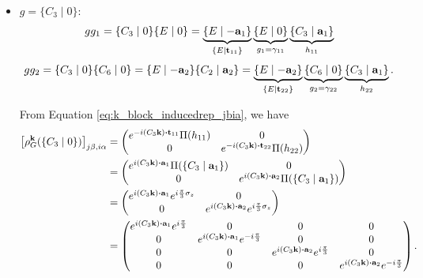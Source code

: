 \begin{itemize}
\item $g = \{C_3\mid 0\}$:
\begin{equation} \label{eq:spinful_graphene_generator_C3_g1_induced}
gg_1 = \{C_3 \mid 0\} \{E \mid 0\} = \underbrace{\{E \mid -{\vb{a}}_1\}}_{\{E\mid{\vb{t}}_{11}\}} \underbrace{\{E \mid 0\}}_{g_1 = \gamma_{11}} \underbrace{\{C_3 \mid {\vb{a}}_1\}}_{h_{11}}
\end{equation}
\begin{equation} \label{eq:spinful_graphene_C3_gg2}
gg_2 = \{C_3\mid 0\}\{C_6\mid 0\}= \{E\mid-{\vb{a}}_2\}\{C_2\mid{\vb{a}}_2\}= \underbrace{\{E\mid -{\vb{a}}_2\}}_{\{E\mid {\vb{t}}_{22}\}} \underbrace{\{C_6 \mid 0\}}_{g_2 = \gamma_{22}} \underbrace{\{C_3 \mid {\vb{a}}_1\}}_{h_{22}}.
\end{equation}

From Equation \ref{eq:k_block_inducedrep_jbia}, we have
\begin{align} \label{eq:rhoC3_inducedrep_k_jbia}
\qty[\rho_G^\k(\{C_3\mid0\})]_{j\beta,i\alpha} &=
\begin{pmatrix}
e^{-i(C_3 \k) \vdot \t_{11}} \Pi(h_{11}) & 0 \\
0 & e^{-i(C_3 \k) \vdot \t_{22}} \Pi(h_{22})
\end{pmatrix} \\
&=
\begin{pmatrix}
e^{i(C_3 \k) \vdot \a_1 }\Pi(\{C_3\mid\a_1\}) & 0 \\
0 & e^{i(C_3 \k) \vdot \a_2} \Pi(\{C_3\mid\a_1\})
\end{pmatrix} \\
&=
\begin{pmatrix}
e^{i(C_3 \k) \vdot \a_1} e^{i\frac{\pi}{3} \sigma_z} & 0 \\
0 & e^{i(C_3 \k) \vdot \a_2} e^{i\frac{\pi}{3} \sigma_z}
\end{pmatrix} \\
&=
\begin{pmatrix}
e^{i(C_3 \k) \vdot \a_1} e^{i\frac{\pi}{3}} & 0 & 0 & 0 \\
0 & e^{i(C_3 \k) \vdot \a_1} e^{-i\frac{\pi}{3}} & 0 & 0 \\
0 & 0 & e^{i(C_3 \k) \vdot \a_2} e^{i\frac{\pi}{3}} & 0 \\
0 & 0 & 0 & e^{i(C_3 \k) \vdot \a_2} e^{-i\frac{\pi}{3}} \\
\end{pmatrix}.
\end{align}


\end{itemize}
